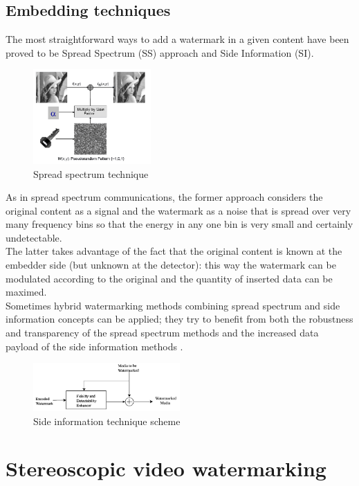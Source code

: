 \subsection{Embedding techniques}
The most straightforward ways to add a watermark in a given content have been proved to be Spread Spectrum (SS) approach and Side Information (SI).\\
\begin{figure}[h!]
\centering
\includegraphics[width=0.4\textwidth]{./img/ss.png}
\caption{\small{Spread spectrum technique}}
\label{fig:ss}
\end{figure}
As in spread spectrum communications, the former approach considers the original content as a signal and the watermark as a noise that is spread over very many frequency bins so that the energy in any one bin is very small and certainly undetectable\cite{COX}\cite{COX1}.\\
The latter takes advantage of the fact that the original content is known at the embedder side (but unknown at the detector): this way the watermark can be modulated  according to the original and the quantity of inserted data can be maximed\cite{COX2,SH, EG, COSTA}.\\

Sometimes hybrid watermarking methods combining spread spectrum and side information concepts can be applied; they try to benefit from both the robustness and transparency of the spread spectrum methods and the increased data payload of the side information methods \cite{QIM}\cite{QIM1}.
\begin{figure}[h!]
\centering
\includegraphics[width=0.5\textwidth]{./img/si.png}
\caption{\small{Side information technique scheme}}
\label{fig:si}
\end{figure}

\section{Stereoscopic video watermarking}

